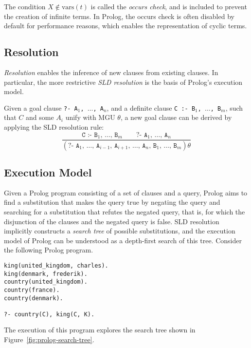 The condition $X \notin \text{vars}(t)$ is called the \emph{occurs check}, and is included to prevent the creation of infinite terms. In Prolog, the occurs check is often disabled by default for performance reasons, which enables the representation of cyclic terms.

\subsection{Resolution}

\emph{Resolution} enables the inference of new clauses from existing clauses. In particular, the more restrictive \emph{SLD resolution} is the basis of Prolog's execution model.

Given a goal clause \texttt{?- A$_1$, $\ldots$, A$_n$}, and a definite clause \texttt{C :- B$_1$, $\ldots$, B$_m$}, such that $C$ and some $A_i$ unify with MGU $\theta$, a new goal clause can be derived by applying the SLD resolution rule:
$$
\frac{\texttt{C :- B$_1$, $\ldots$, B$_m$} \qquad \texttt{?- A$_1$, $\ldots$, A$_n$}}{(\texttt{?- A$_1$, $\ldots$, A$_{i-1}$, A$_{i+1}$, $\ldots$, A$_n$, B$_1$, $\ldots$, B$_m$})\theta}
$$

\subsection{Execution Model}

Given a Prolog program consisting of a set of clauses and a query, Prolog aims to find a substitution that makes the query true by negating the query and searching for a substitution that refutes the negated query, that is, for which the disjunction of the clauses and the negated query is false. SLD resolution implicitly constructs a \emph{search tree} of possible substitutions, and the execution model of Prolog can be understood as a depth-first search of this tree. Consider the following Prolog program.

\begin{center}
\begin{verbatim}
king(united_kingdom, charles).
king(denmark, frederik).
country(united_kingdom).
country(france).
country(denmark).

?- country(C), king(C, K).
\end{verbatim}
\end{center}

The execution of this program explores the search tree shown in Figure~\ref{fig:prolog-search-tree}.

